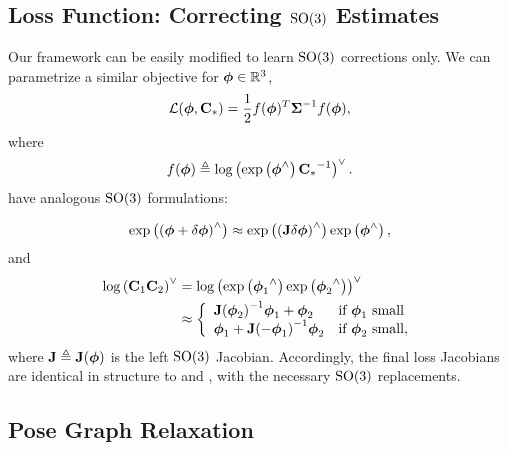\subsection{Loss Function: Correcting $\mathrm{SO}(3)$ Estimates}
Our framework can be easily modified to learn $\mathrm{SO}(3)$ corrections only. We can parametrize a similar objective for $\boldsymbol{\mathbf{\phi}} \in \mathbb{R}^3$,
\begin{equation}
	\label{eq:so3loss_fn}
\mathcal{L} (\boldsymbol{\mathbf{\phi}}, \boldsymbol{\mathbf{C}}_*) = \frac{1}{2} f({\boldsymbol{\mathbf{\phi}}})^T {\boldsymbol{\mathbf{\Sigma}}}^{-1} f({\boldsymbol{\mathbf{\phi}}}),
\end{equation}
where 
\begin{equation}
	\label{eq:s03logmap_fn}
	f({\boldsymbol{\mathbf{\phi}}}) \triangleq \mathrm{log}\left({\mathrm{exp}\left({\boldsymbol{\mathbf{\phi}}}^{\wedge}\right) {\boldsymbol{\mathbf{C}}_*}^{-1}}\right)^{\vee}.
\end{equation}
 have analogous $\mathrm{SO}(3)$ formulations:

\begin{equation}
\label{eq:delta_phi_exp}
\mathrm{exp}\left({( \boldsymbol{\mathbf{\phi}} + \delta \boldsymbol{\mathbf{\phi}})}^{\wedge}\right) \approx \mathrm{exp}\left({(\boldsymbol{\mathbf{J}} \delta \boldsymbol{\mathbf{\phi}})}^{\wedge}\right) \mathrm{exp}\left({\boldsymbol{\mathbf{\phi}}}^{\wedge}\right),
\end{equation}
and
\begin{align}
\label{eq:jacobian_phi_small}
\mathrm{log}\left({\boldsymbol{\mathbf{C}}_1 \boldsymbol{\mathbf{C}}_2}\right)^{\vee} &= \mathrm{log}\left({ \mathrm{exp}\left({\boldsymbol{\mathbf{\phi}}_1}^{\wedge}\right) \mathrm{exp}\left({\boldsymbol{\mathbf{\phi}}_2}^{\wedge}\right) }\right)^{\vee} \nonumber \\
								  &\approx \left\{
	\begin{array}{ll}
		{  \boldsymbol{\mathbf{J}}  (  \boldsymbol{\mathbf{\phi}}  _2)}^{-1} \boldsymbol{\mathbf{\phi}}_1 + \boldsymbol{\mathbf{\phi}}_2   & \mbox{if } \boldsymbol{\mathbf{\phi}}_1 ~ \mbox{small} \\
		\boldsymbol{\mathbf{\phi}}_1 + {\boldsymbol{\mathbf{J}}(-\boldsymbol{\mathbf{\phi}}_1)}^{-1} \boldsymbol{\mathbf{\phi}}_2 & \mbox{if } \boldsymbol{\mathbf{\phi}}_2 ~ \mbox{small},
	\end{array}
\right.
\end{align}
where $\boldsymbol{\mathbf{J}} \triangleq \boldsymbol{\mathbf{J}}(\boldsymbol{\mathbf{\phi}})$ is the left $\mathrm{SO}(3)$ Jacobian. Accordingly, the final loss Jacobians are identical in structure to  and , with the necessary $\mathrm{SO}(3)$ replacements.

\subsection{Pose Graph Relaxation}

